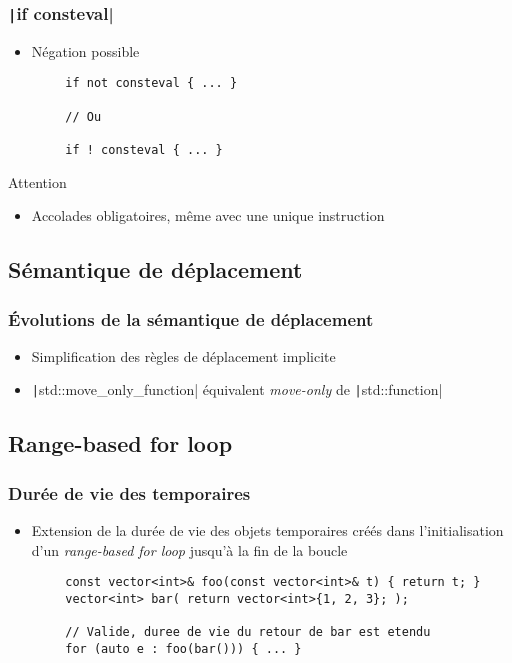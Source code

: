 \documentclass[C++.tex]{subfiles}
\begin{document}
\begin{frame}[fragile]
	\frametitle{\texttt|if consteval|}
	\begin{itemize}
		\item Négation possible
	\end{itemize}

	\begin{verbatim}
		if not consteval { ... }

		// Ou

		if ! consteval { ... }
	\end{verbatim}

	\begin{alertblock}{Attention}
		\begin{itemize}
			\item Accolades obligatoires, même avec une unique instruction
		\end{itemize}
	\end{alertblock}
\end{frame}

\subsection*{Sémantique de déplacement}
\begin{frame}[fragile]
	\frametitle{Évolutions de la sémantique de déplacement}
	\begin{itemize}
		\item Simplification des règles de déplacement implicite
		\item \texttt|std::move_only_function| équivalent \textit{move-only} de \texttt|std::function|
	\end{itemize}
\end{frame}

\subsection*{Range-based for loop}
\begin{frame}[fragile]
	\frametitle{Durée de vie des temporaires}
	\begin{itemize}
		\item Extension de la durée de vie des objets temporaires créés dans l'initialisation d'un \textit{range-based for loop} jusqu'à la fin de la boucle
	\end{itemize}

	\begin{verbatim}
		const vector<int>& foo(const vector<int>& t) { return t; }
		vector<int> bar( return vector<int>{1, 2, 3}; );

		// Valide, duree de vie du retour de bar est etendu
		for (auto e : foo(bar())) { ... }
	\end{verbatim}
\end{frame}
\end{document}
